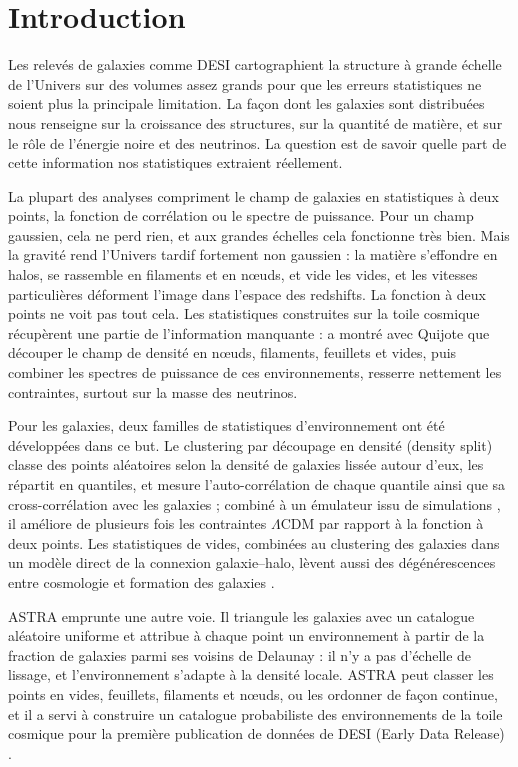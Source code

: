 \section{Introduction}

Les relevés de galaxies comme DESI cartographient la structure à grande échelle de l'Univers sur des volumes assez grands pour que les erreurs statistiques ne soient plus la principale limitation. La façon dont les galaxies sont distribuées nous renseigne sur la croissance des structures, sur la quantité de matière, et sur le rôle de l'énergie noire et des neutrinos. La question est de savoir quelle part de cette information nos statistiques extraient réellement.

La plupart des analyses compriment le champ de galaxies en statistiques à deux points, la fonction de corrélation ou le spectre de puissance. Pour un champ gaussien, cela ne perd rien, et aux grandes échelles cela fonctionne très bien. Mais la gravité rend l'Univers tardif fortement non gaussien : la matière s'effondre en halos, se rassemble en filaments et en nœuds, et vide les vides, et les vitesses particulières déforment l'image dans l'espace des redshifts. La fonction à deux points ne voit pas tout cela. Les statistiques construites sur la toile cosmique récupèrent une partie de l'information manquante : \cite{Sunseri} a montré avec Quijote que découper le champ de densité en nœuds, filaments, feuillets et vides, puis combiner les spectres de puissance de ces environnements, resserre nettement les contraintes, surtout sur la masse des neutrinos.

Pour les galaxies, deux familles de statistiques d'environnement ont été développées dans ce but. Le clustering par découpage en densité (density split) \cite{Paillas2023, Paillas2024} classe des points aléatoires selon la densité de galaxies lissée autour d'eux, les répartit en quantiles, et mesure l'auto-corrélation de chaque quantile ainsi que sa cross-corrélation avec les galaxies ; combiné à un émulateur issu de simulations \cite{CuestaLazaro2024}, il améliore de plusieurs fois les contraintes $\Lambda$CDM par rapport à la fonction à deux points. Les statistiques de vides, combinées au clustering des galaxies dans un modèle direct de la connexion galaxie--halo, lèvent aussi des dégénérescences entre cosmologie et formation des galaxies \cite{Salcedo}.

ASTRA \cite{ASTRA} emprunte une autre voie. Il triangule les galaxies avec un catalogue aléatoire uniforme et attribue à chaque point un environnement à partir de la fraction de galaxies parmi ses voisins de Delaunay : il n'y a pas d'échelle de lissage, et l'environnement s'adapte à la densité locale. ASTRA peut classer les points en vides, feuillets, filaments et nœuds, ou les ordonner de façon continue, et il a servi à construire un catalogue probabiliste des environnements de la toile cosmique pour la première publication de données de DESI (Early Data Release) \cite{ZapataZuluaga2026}.

